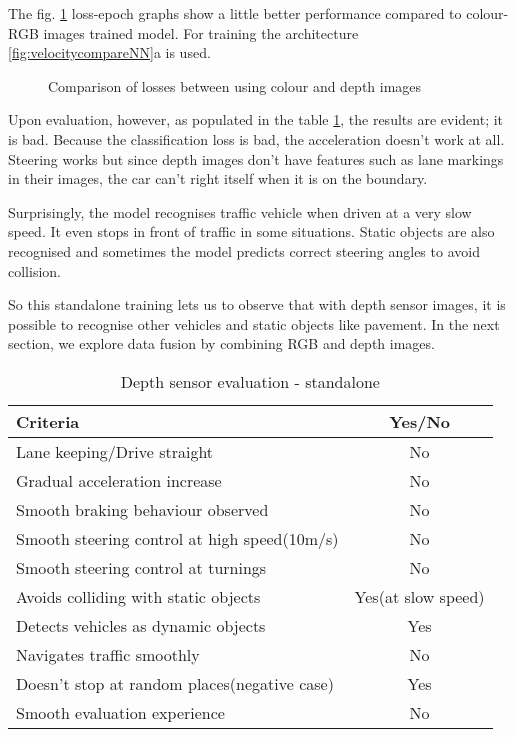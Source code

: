 The fig. \ref{fig:colourvsdepth1} loss-epoch graphs show a little better performance compared to
colour-RGB images trained model. For training the architecture
\ref{fig:velocitycompareNN}a is used.
\begin{figure}[!ht]
    \centering
    \def\svgwidth{\textwidth}
    \caption{Comparison of losses between using colour and depth images}
    \label{fig:colourvsdepth1}
\end{figure}
Upon evaluation, however, as populated in the table \ref{table:depthsensorstandalone},
the results are evident; it is bad. Because the classification loss is bad, the
acceleration doesn't work at all. Steering works but since depth images don't have
features such as lane markings in their images, the car can't right itself when it is on
the boundary.

Surprisingly, the model recognises traffic vehicle when driven at a very slow speed. It
even stops in front of traffic in some situations. Static objects are also recognised and
sometimes the model predicts correct steering angles to avoid collision.

So this standalone training lets us to observe that with depth sensor images, it is
possible to recognise other vehicles and static objects like pavement. In the next
section, we explore data fusion by combining RGB and depth images.
\begin{table}[!ht]
    \centering
\begin{tabular}{lc}
    \toprule
    Criteria  & Yes/No \\\midrule
    Lane keeping/Drive straight  & No  \\
    Gradual acceleration increase  & No\\
    Smooth braking behaviour observed & No \\
    Smooth steering control at high speed(10m/s) & No \\
    Smooth steering control at turnings & No\\
    Avoids colliding with static objects & Yes(at slow speed) \\
    Detects vehicles as dynamic objects & Yes \\
    Navigates traffic smoothly & No\\
    Doesn't stop at random places(negative case) & Yes \\
    Smooth evaluation experience & No \\\bottomrule
\end{tabular}
\caption{Depth sensor evaluation - standalone}
\label{table:depthsensorstandalone}
\end{table}

